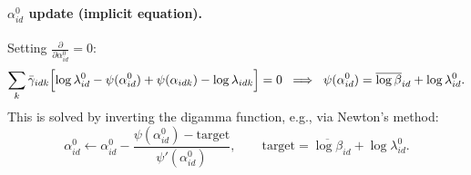 \documentclass[11pt]{article}
\newcommand{\gb}{\bar{\gamma}}
\theoremstyle{definition}
\begin{document}
\paragraph{$\alpha_{id}^0$ update (implicit equation).}
Setting $\frac{\partial}{\partial \alpha_{id}^0} = 0$:
\[
  \sum_k \gb_{idk} \Bigl[ \log \lambda_{id}^0 - \psi(\alpha_{id}^0) + \psi(\alpha_{idk}) - \log \lambda_{idk} \Bigr] = 0
  \;\;\Longrightarrow\;\;
  \psi(\alpha_{id}^0) = \overline{\log \beta}_{id} + \log \lambda_{id}^0.
\]
This is solved by inverting the digamma function, e.g., via Newton's method:
\[
  \alpha_{id}^0 \leftarrow \alpha_{id}^0 - \frac{\psi(\alpha_{id}^0) - \text{target}}{\psi'(\alpha_{id}^0)}, \qquad \text{target} = \overline{\log \beta}_{id} + \log \lambda_{id}^0.
\]
\end{document}
